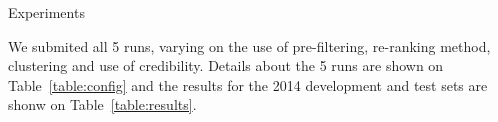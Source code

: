 
\begin{section}{Experiments}

We submited all 5 runs, varying on the use of pre-filtering, re-ranking method, clustering and use of credibility.
Details about the 5 runs are shown on Table~\ref{table:config} and the results for the 2014 development and test sets are shonw on Table~\ref{table:results}.

%
%

\end{section}

